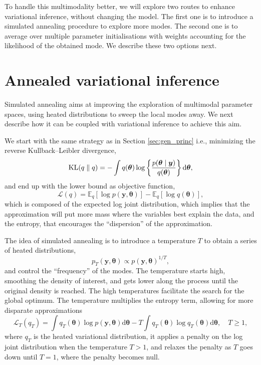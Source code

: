 \documentclass[a4paper, 11pt]{report}
\numberwithin{equation}{chapter}
\DeclareMathOperator*{\KL}{{\rm KL}}
\begin{document}
To handle this multimodality better, we will explore two routes to enhance variational inference, without changing the model. The first one is to introduce a simulated annealing procedure to explore more modes. The second one is to average over multiple parameter initialisations with weights accounting for the likelihood of the obtained mode. We describe these two options next.
\section{Annealed variational inference} \label{sec:ann}
Simulated annealing aims at improving the exploration of multimodal parameter spaces, using heated distributions to sweep the local modes away. We next describe how it can be coupled with variational inference to achieve this aim.

We start with the same strategy as in Section \ref{sec:gen_princ} i.e., minimizing the reverse Kullback--Leibler divergence,
\begin{equation*}
\KL(q \parallel q) = -\int q(\boldsymbol{\theta}) \log\left\lbrace\frac{p(\boldsymbol{\theta}\mid\boldsymbol{y})}{q(\boldsymbol{\theta})}\right\rbrace \mathrm{d}\boldsymbol{\theta},
\end{equation*}
and end up with the lower bound as objective function,
\begin{equation*}
\mathcal{L}(q) = \mathbb{E}_q\left[ \log p(\boldsymbol{y}, \boldsymbol{\theta})\right] - \mathbb{E}_q\left[\log q(\boldsymbol{\theta})\right],
\end{equation*}
which is composed of the expected log joint distribution, which implies that the approximation will put more mass where the variables best explain the data, and the entropy, that encourages the ``dispersion'' of the approximation. 

The idea of simulated annealing is to introduce a temperature $T$ to obtain a series of heated distributions,
\begin{equation*}
p_T(\boldsymbol{y},\boldsymbol{\theta}) \propto p(\boldsymbol{y},\boldsymbol{\theta})^{1/T},
\end{equation*}
and control the ``frequency'' of the modes. The temperature starts high, smoothing the density of interest, and gets lower along the process until the original density is reached. The high temperatures facilitate the search for the global optimum. The temperature multiplies the entropy term, allowing for more disparate approximations
\begin{equation}
\mathcal{L}_T(q_T) = \int q_T(\boldsymbol{\theta}) \log p(\boldsymbol{y},\boldsymbol{\theta})\mathrm{d}\boldsymbol{\theta} - T \int q_T(\boldsymbol{\theta}) \log q_T(\boldsymbol{\theta}) \mathrm{d}\boldsymbol{\theta},\quad T\geq 1,
\label{eq:ann_elbo}
\end{equation}
where $q_T$ is the heated variational distribution, it applies a penalty on the log joint distribution when the temperature $T > 1$, and relaxes the penalty as $T$ goes down until $T = 1$, where the penalty becomes null.
\end{document}
